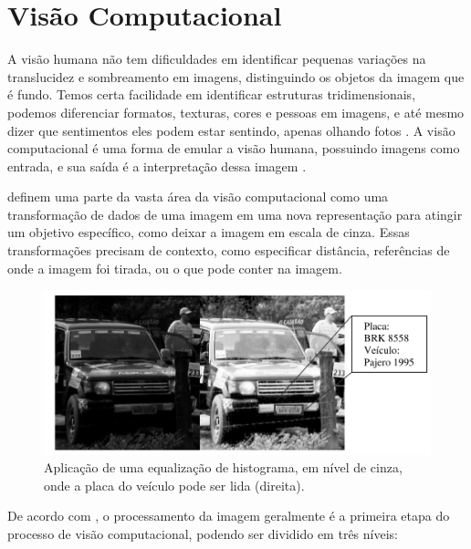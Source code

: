 
\section{Visão Computacional}

A visão humana não tem dificuldades em identificar pequenas variações na translucidez e sombreamento em imagens, distinguindo os objetos da imagem que é fundo. Temos certa facilidade em identificar estruturas tridimensionais, podemos diferenciar formatos, texturas, cores e pessoas em imagens, e até mesmo dizer que sentimentos eles podem estar sentindo, apenas olhando fotos \cite{szeliski2010computer}.
% 
A visão computacional é uma forma de emular a visão humana, possuindo imagens como entrada, e sua saída é a interpretação dessa imagem \cite{marengoni:2009}.

 definem uma parte da vasta área da visão computacional como uma transformação de dados de uma imagem em uma nova representação para atingir um objetivo específico, como deixar a imagem em escala de cinza. Essas transformações precisam de contexto, como especificar distância, referências de onde a imagem foi tirada, ou o que pode conter na imagem.

\begin{figure}[h]
	\caption{\label{fig:grayscaleex}Aplicação de uma equalização de histograma, em nível de cinza, onde a placa do veículo pode ser lida (direita).}
	\begin{center}
	    \includegraphics[width=.7\textwidth]{resources/grayscaleex}
	\end{center}
\end{figure}


De acordo com , o processamento da imagem geralmente é a primeira etapa do processo de visão computacional, podendo ser dividido em três níveis: 

